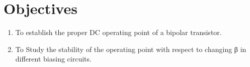 \section{Objectives}
\begin{enumerate}
  \setlength{\itemsep}{0pt}
        \setlength{\parskip}{0pt}
        \setlength{\parsep}{0pt}
  \item To establish the proper DC operating point of a bipolar transistor.
  \item To Study the stability of the operating point with respect to changing β in different biasing circuits.
\end{enumerate}
